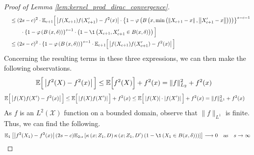 \begin{proof}[Proof of Lemma \ref{lem:kernel_prod_dirac_convergence}]
\begin{equation}
\begin{aligned}
            & \quad \leq (2s-c)^{2} \cdot
                \E_{c+1}\Big[\left|f(X_{c+1}) f(X_{c+1}^{\prime}) - f^{2}(x)\right|
                \cdot \left\{1-\varphi\left(B\left(x, \min\left(\left\|X_{c+1} - x\right\|, \left\|X_{c+1}^{\prime}-x\right\|\right)\right)\right)\right\}^{s-c-1} \\
                & \quad \quad \quad \cdot \left\{1-\varphi\left(B\left(x,\delta\right)\right)\right\}^{s-1}
                \cdot \left(1 - \1\left(X_{c+1}, X_{c+1}^{\prime} \in B(x, \delta)\right)\right)
            \Big]\\
            & \quad \leq (2s-c)^{2} \cdot \left\{1-\varphi\left(B\left(x,\delta\right)\right)\right\}^{s-1} \cdot
                \E_{c+1}\Big[\left|f(X_{c+1}) f(X_{c+1}^{\prime}) - f^{2}(x)\right|\Big]
        \end{aligned}
    \end{equation}
    Concerning the resulting terms in these three expressions, we can then make the following observations.
    \begin{equation}
        \begin{aligned}
            \mathbb{E}\Big[\left|f^{2}(X) - f^{2}(x)\right|\Big]
            & \leq \mathbb{E}\Big[f^{2}(X)\Big] + f^{2}(x)
            = \|f\|_{L_2}^{2} + f^{2}(x)
        \end{aligned}
    \end{equation}
    \begin{equation}
        \begin{aligned}
            \mathbb{E}\Big[\left|f(X) f(X^{\prime}) - f^{2}(x)\right|\Big]
            & \leq \mathbb{E}\Big[\left|f(X) f(X^{\prime})\right|\Big] + f^{2}(x)
            \leq \mathbb{E}\Big[\left|f(X)\right|\cdot \left|f(X^{\prime})\right|\Big] + f^{2}(x)
            = \|f\|_{L^{1}}^{2} + f^{2}(x)
        \end{aligned}
    \end{equation}
    As $f$ is an $L^{2}(\mathcal{X})$ function on a bounded domain, observe that $\|f\|_{L^{1}}$ is finite.
    Thus, we can find the following.
    \begin{equation}
        \begin{aligned}
            \E_{1}\left[\left|f^{2}(X_{1}) - f^{2}(x) \right| (2s - c) 
                \E_{2:s}\left[\kappa\left(x; Z_{1}, D\right)\kappa\left(x; Z_{1}, D^{\prime}\right) 
                \left(1 - \1\left(X_1 \in B(x, \delta)\right)\right)
                \right]
            \right]
            \longrightarrow 0 \quad \text{as} \quad s \rightarrow \infty

\end{aligned}
\end{equation}
\end{proof}
